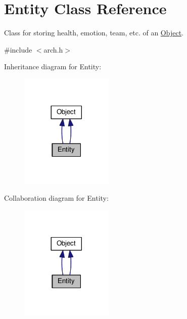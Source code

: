 \hypertarget{classEntity}{}\section{Entity Class Reference}
\label{classEntity}


Class for storing health, emotion, team, etc. of an \hyperlink{classObject}{Object}.  




{\ttfamily \#include $<$arch.\+h$>$}



Inheritance diagram for Entity\+:
\nopagebreak
\begin{figure}[H]
\begin{center}
\leavevmode
\includegraphics[width=125pt]{classEntity__inherit__graph}
\end{center}
\end{figure}


Collaboration diagram for Entity\+:
\nopagebreak
\begin{figure}[H]
\begin{center}
\leavevmode
\includegraphics[width=125pt]{classEntity__coll__graph}
\end{center}
\end{figure}
